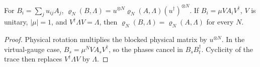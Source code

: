 \begin{lemma}
    \label{thm:stationary_density_covariance}
    \leanok
    For $B_i=\sum_j u_{ij}A_j$,
    $\varrho_N(B,\Lambda)=u^{\otimes N}\varrho_N(A,\Lambda)(u^\dagger)^{\otimes N}$.
    If $B_i=\mu VA_iV^\dagger$, $V$ is unitary, $|\mu|=1$, and
    $V^\dagger\Lambda V=\Lambda$, then
    $\varrho_N(B,\Lambda)=\varrho_N(A,\Lambda)$ for every $N$.
\end{lemma}

\begin{proof}
    \leanok
    Physical rotation multiplies the blocked physical matrix by
    $u^{\otimes N}$. In the virtual-gauge case,
    $B_s=\mu^NVA_sV^\dagger$, so the phases cancel in
    $B_sB_t^\dagger$. Cyclicity of the trace then replaces
    $V^\dagger\Lambda V$ by $\Lambda$.
\end{proof}
